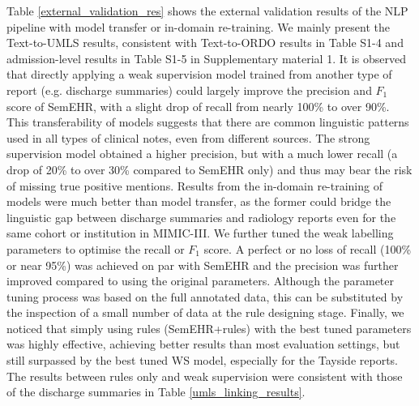 \documentclass[twocolumn]{bmcart}
\begin{document}
Table \ref{external_validation_res} shows the external validation results of the NLP pipeline with model transfer or in-domain re-training. We mainly present the Text-to-UMLS results, consistent with Text-to-ORDO results in Table S1-4 and admission-level results in Table S1-5 in Supplementary material 1. It is observed that directly applying a weak supervision model trained from another type of report (e.g. discharge summaries) could largely improve the precision and $F_1$ score of SemEHR, with a slight drop of recall from nearly 100\% to over 90\%. This transferability of models suggests that there are common linguistic patterns used in all types of clinical notes, even from different sources. The strong supervision model obtained a higher precision, but with a much lower recall (a drop of 20\% to over 30\% compared to SemEHR only) and thus may bear the risk of missing true positive mentions. Results from the in-domain re-training of models were much better than model transfer, as the former could bridge the linguistic gap between discharge summaries and radiology reports even for the same cohort or institution in MIMIC-III. We further tuned the weak labelling parameters to optimise the recall or $F_1$ score. A perfect or no loss of recall (100\% or near 95\%) was achieved on par with SemEHR and the precision was further improved compared to using the original parameters. Although the parameter tuning process was based on the full annotated data, this can be substituted by the inspection of a small number of data at the rule designing stage. Finally, we noticed that simply using rules (SemEHR+rules) with the best tuned parameters was highly effective, achieving better results than most evaluation settings, but still surpassed by the best tuned WS model, especially for the Tayside reports. The results between rules only and weak supervision were consistent with those of the discharge summaries in Table \ref{umls_linking_results}.
\end{document}
